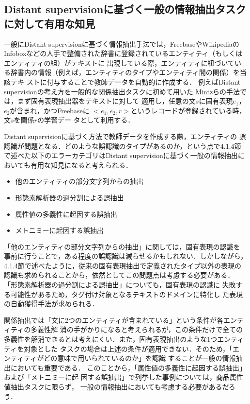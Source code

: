 \documentclass[japanese]{jnlp_1.4}
\begin{document}
\subsection{Distant supervisionに基づく一般の情報抽出タスクに対して有用な知見}
\label{chiken}

一般にDistant supervisionに基づく情報抽出手法では，FreebaseやWikipediaのInfoboxなどの人手で整備された辞書に登録されているエンティティ（もしくはエンティティの組）がテキストに
出現している際，エンティティに紐づいている辞書内の情報（例えば，エンティティのタイプやエンティティ間の関係）を当該テキ
ストに付与することで教師データを自動的に作成する．
例えばDistant supervisionの考え方を一般的な関係抽出タスクに初めて用いた
Mintzら\cite{mintz2009}の手法では，まず固有表現抽出器をテキストに対して
適用し，任意の文$s$に固有表現$e_1$，$e_2$が含まれ，かつFreebaseに
$<e_1, e_2, r>$というレコードが登録されている時，文$s$を関係$r$の学習デー
タとして利用する．

Distant supervisionに基づく方法で教師データを作成する際，エンティティの
誤認識が問題となる．どのような誤認識のタイプがあるのか，という点で4.1.4節
で述べた以下のエラーカテゴリはDistant supervisionに基づく一般の情報抽出においても有用な知見になると考えられる．

\begin{itemize}
\item 他のエンティティの部分文字列からの抽出
\item 形態素解析器の過分割による誤抽出
\item 属性値の多義性に起因する誤抽出
\item メトニミーに起因する誤抽出
\end{itemize}

\noindent
「他のエンティティの部分文字列からの抽出」に関しては，固有表現の認識を
事前に行うことで，ある程度の誤認識は減らせるかもしれない．しかしながら，
4.1.4節で述べたように，従来の固有表現抽出で定義されたタイプ以外の表現の
認識も求められることから，依然としてこの問題点は考慮する必要がある．
「形態素解析器の過分割による誤抽出」についても，固有表現の認識に
失敗する可能性があるため，タグ付け対象となるテキストのドメインに特化し
た表現の自動獲得手法が求められる．

関係抽出では「文に2つのエンティティが含まれている」という条件が各エンティティの多義性解
消の手がかりになると考えられるが，この条件だけで全ての多義性を解消できるとは考えにくい．また，固有表現抽出のような1つエンティティを対象とした
タスクの場合は上述の条件が適用できない．そのため，「エ
ンティティがどの意味で用いられているのか」を認識
することが一般の情報抽出においても重要である．
このことから，「属性値の多義性に起因する誤抽出」および「メトニミーに起
因する誤抽出」で列挙した事例については，商品属性値抽出タスクに限らず，
一般の情報抽出においても考慮する必要があるだろう．
\end{document}
